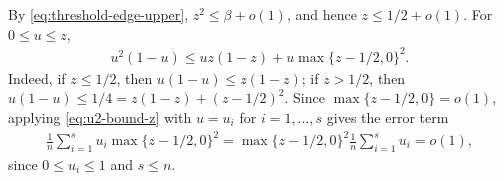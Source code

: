 \documentclass[10pt,a4paper]{article}
\begin{document}
    By \eqref{eq:threshold-edge-upper}, $z^2\le\beta+o(1)$, and hence $z\le1/2+o(1)$.  For $0\le u\le z$,
    \begin{align}\label{eq:u2-bound-z}
      u^2(1-u)\le u z(1-z)+u\max\{z-1/2,0\}^2.
    \end{align}
    Indeed, if $z\le1/2$, then $u(1-u)\le z(1-z)$; if $z>1/2$, then
    $u(1-u)\le1/4=z(1-z)+(z-1/2)^2$.  Since
    $\max\{z-1/2,0\}=o(1)$, applying  \eqref{eq:u2-bound-z} with $u=u_i$ for
    $i=1,\ldots,s$ gives the error term
    \begin{align*}
      \frac1n\sum_{i=1}^s u_i\max\{z-1/2,0\}^2
      =\max\{z-1/2,0\}^2\frac1n\sum_{i=1}^s u_i=o(1),
    \end{align*}
    since $0\le u_i\le1$ and $s\le n$.
    
\end{document}

